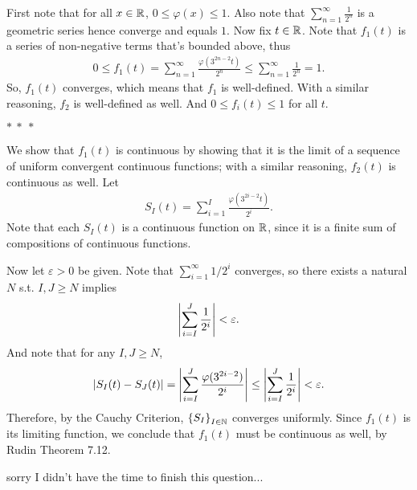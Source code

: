 \documentclass[12pt]{article}
\begin{document}
\begin{fproof}[4(a)]
    First note that for all \(x \in \mathbb {R}\), \(0 \leq \varphi(x) \leq 1\).
    Also note that \(\sum_{n=1}^{\infty}\frac{1}{2^n}\) is a geometric series hence converge and equals \(1\).
    Now fix \(t \in \mathbb {R}\).
    Note that \(f_1(t)\) is a series of non-negative terms that's bounded above, thus
    \begin{align*}
        0 \leq f_1(t) =  \sum_{n=1}^{\infty} \frac{\varphi(3^{2n-2}t)}{2^n} \leq \sum_{n=1}^{\infty} \frac{1}{2^n} = 1.
    \end{align*}
    So, \(f_1(t)\) converges, which means that \(f_1\) is well-defined.
    With a similar reasoning, \(f_2\) is well-defined as well.
    And \(0 \leq f_i(t) \leq 1\) for all \(t\).

    \begin{center}
        \(\ast~\ast~\ast\)
    \end{center}

    We show that \(f_1(t)\) is continuous by showing that it is the limit of a sequence of uniform convergent continuous functions; with a similar reasoning, \(f_2(t)\) is continuous as well.
    Let 
    \begin{align*}
        S_I(t) = \sum_{i=1}^{I} \frac{\varphi(3^{2i-2}t)}{2^i}.
    \end{align*}
    Note that each \(S_I(t)\) is a continuous function on \(\mathbb {R}\), since it is a finite sum of compositions of continuous functions.

    Now let \(\varepsilon > 0\) be given.
    Note that \(\sum_{i=1}^{\infty} 1/2^i\) converges, so there exists a natural \(N\) s.t. \(I, J \geq N\) implies \[\left\lvert \sum_{i=I}^{J} \frac{1}{2^i} \right\rvert < \varepsilon.\]
    And note that for any \(I,J \geq N\),
    \begin{align*}
        \left\lvert S_I(t) - S_J(t) \right\rvert= \left\lvert \sum_{i=I}^{J} \frac{\varphi(3^{2i-2})}{2^i}  \right\rvert \leq \left\lvert \sum_{i=I}^{J} \frac{1}{2^i} \right\rvert < \varepsilon.
    \end{align*}
    Therefore, by the Cauchy Criterion, \(\left\{ S_I \right\}_{I\in \mathbb {N}}\) converges uniformly.
    Since \(f_1(t)\) is its limiting function, we conclude that \(f_1(t)\) must be continuous as well, by Rudin Theorem 7.12.

\end{fproof}

\begin{fproof}[4(b)]
    sorry I didn't have the time to finish this question...
\end{fproof}
\end{document}
